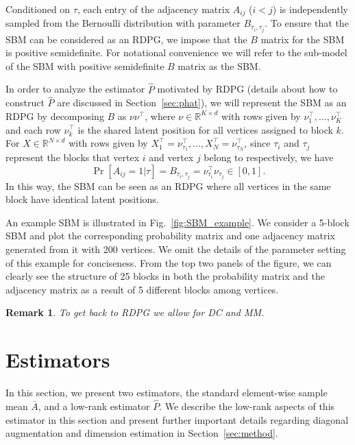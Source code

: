 \documentclass[10pt,letterpaper]{article}
\newtheorem{remark}[fact]{Remark}
\renewcommand{\Re}{\mathbb{R}}
\renewcommand{\hat}{\widehat}
\begin{document}
Conditioned on $\tau$, each entry of the adjacency matrix $A_{ij}$ ($i < j$) is independently sampled from the Bernoulli distribution with parameter $B_{\tau_i,\tau_j}$.
To ensure that the SBM can be considered as an RDPG, we impose that the $B$ matrix for the SBM is positive semidefinite. 
For notational convenience we will refer to the sub-model of the SBM with positive semidefinite $B$ matrix as the SBM.

In order to analyze the estimator $\hat{P}$ motivated by RDPG (details about how to construct $\hat{P}$ are discussed in Section~\ref{sec:phat}), we will represent the SBM as an RDPG by
decomposing $B$ as $\nu \nu^{\top}$, where $\nu \in \Re^{K \times d}$ with rows given by $\nu_1^{\top}, \dotsc, \nu_K^{\top}$ and each row $\nu_k^{\top}$ is the shared latent position for all vertices assigned to block $k$. 
For $X \in \Re^{N \times d}$ with rows given by $X_1^{\top} = \nu_{\tau_1}^{\top}, \dotsc, X_N^{\top} = \nu_{\tau_N}^{\top}$, since $\tau_i$ and $\tau_j$ represent the blocks that vertex $i$ and vertex $j$ belong to respectively, we have
\[
    \Pr[A_{ij} = 1|\tau] = B_{\tau_i, \tau_j} = \nu_{\tau_i}^{\top} \nu_{\tau_j}^{\phantom{\top}} \in [0, 1].
\]
In this way, the SBM can be seen as an RDPG where all vertices in the same block have identical latent positions.

An example SBM is illustrated in Fig.~\ref{fig:SBM_example}.
We consider a 5-block SBM and plot the corresponding probability matrix and one adjacency matrix generated from it with 200 vertices. We omit the details of the parameter setting of this example for conciseness. From the top two panels of the figure, we can clearly see the structure of 25 blocks in both the probability matrix and the adjacency matrix as a result of 5 different blocks among vertices.

\begin{remark}
To get back to RDPG we allow for DC and MM.
\end{remark}


\section{Estimators}
\label{sec:estimator}

In this section, we present two estimators, the standard element-wise sample mean $\bar{A}$, and a low-rank estimator $\hat{P}$.
We describe the low-rank aspects of this estimator in this section and present further important details regarding diagonal augmentation and dimension estimation in Section~\ref{sec:method}.
\end{document}
